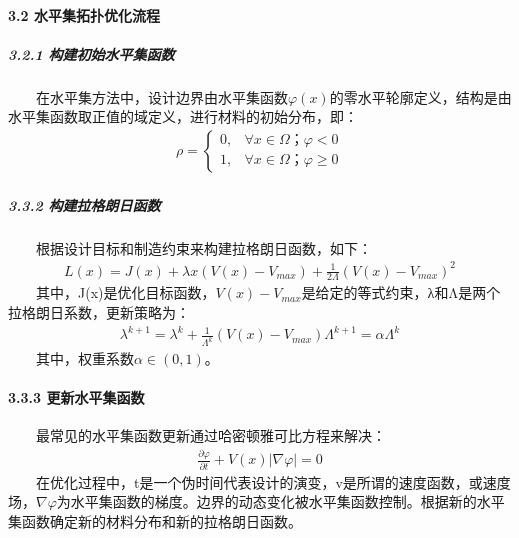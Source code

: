 \documentclass[letterpaper,10pt,english]{sphinxmanual}
\begin{document}
\paragraph{3.2 水平集拓扑优化流程}
\label{\detokenize{_u7b80_u4ecb/_u6838_u5fc3_u8bbe_u8ba1_u4f18_u5316_u7b97_u6cd5/_u68af_u5ea6_u62d3_u6251_u4f18_u5316_u6a21_u5757/_u68af_u5ea6_u62d3_u6251_u4f18_u5316_u7b97_u6cd5:id10}}

\subparagraph{3.2.1 构建初始水平集函数}
\label{\detokenize{_u7b80_u4ecb/_u6838_u5fc3_u8bbe_u8ba1_u4f18_u5316_u7b97_u6cd5/_u68af_u5ea6_u62d3_u6251_u4f18_u5316_u6a21_u5757/_u68af_u5ea6_u62d3_u6251_u4f18_u5316_u7b97_u6cd5:id11}}
\sphinxAtStartPar
  在水平集方法中，设计边界由水平集函数\(φ(x)\)的零水平轮廓定义，结构是由水平集函数取正值的域定义，进行材料的初始分布，即：
\begin{equation*}
\begin{split}     ρ=\begin{cases}0,& ∀x∈Ω；φ<0 \\ 1,& ∀x∈Ω；φ≥0 \end{cases}\end{split}
\end{equation*}

\subparagraph{3.3.2 构建拉格朗日函数}
\label{\detokenize{_u7b80_u4ecb/_u6838_u5fc3_u8bbe_u8ba1_u4f18_u5316_u7b97_u6cd5/_u68af_u5ea6_u62d3_u6251_u4f18_u5316_u6a21_u5757/_u68af_u5ea6_u62d3_u6251_u4f18_u5316_u7b97_u6cd5:id12}}
\sphinxAtStartPar
  根据设计目标和制造约束来构建拉格朗日函数，如下：
\begin{equation*}
\begin{split}    L(x)=J(x)+λx(V(x)-V_{max}) +\frac{1}{2Λ}(V(x)-V_{max})^2\end{split}
\end{equation*}
\sphinxAtStartPar
  其中，J(x)是优化目标函数，\(V(x)-V_{max}\)是给定的等式约束，λ和Λ是两个拉格朗日系数，更新策略为：
\begin{equation*}
\begin{split}    λ^{k+1}=λ^{k}+\frac{1}{Λ^k}(V(x)-V_{max})Λ^{k+1}=αΛ^k\end{split}
\end{equation*}
\sphinxAtStartPar
  其中，权重系数\(α∈(0,1)\)。


\paragraph{3.3.3 更新水平集函数}
\label{\detokenize{_u7b80_u4ecb/_u6838_u5fc3_u8bbe_u8ba1_u4f18_u5316_u7b97_u6cd5/_u68af_u5ea6_u62d3_u6251_u4f18_u5316_u6a21_u5757/_u68af_u5ea6_u62d3_u6251_u4f18_u5316_u7b97_u6cd5:id13}}
\sphinxAtStartPar
  最常见的水平集函数更新通过哈密顿\sphinxhyphen{}雅可比方程来解决：
\begin{equation*}
\begin{split}    \frac{\partial φ}{\partial t}+V(x)|\nabla φ| =0\end{split}
\end{equation*}
\sphinxAtStartPar
  在优化过程中，t是一个伪时间代表设计的演变，v是所谓的速度函数，或速度场，\(\nabla φ\)为水平集函数的梯度。边界的动态变化被水平集函数控制。根据新的水平集函数确定新的材料分布和新的拉格朗日函数。
\end{document}
